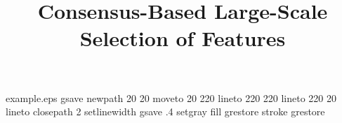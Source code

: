 %
%
%
%
%
\begin{filecontents*}{example.eps}
gsave
newpath
  20 20 moveto
  20 220 lineto
  220 220 lineto
  220 20 lineto
closepath
2 setlinewidth
gsave
  .4 setgray fill
grestore
stroke
grestore
\end{filecontents*}
%
\RequirePackage{fix-cm}
%
\documentclass[smallextended]{svjour3}       %
%
\smartqed  %
%
\usepackage{graphicx}
\usepackage{hyperref}
\usepackage{varioref}
\usepackage{url}
\usepackage{epsfig}
\usepackage{amsmath}
\usepackage{epsfig}
\usepackage{amssymb}
\usepackage{graphicx}
\usepackage{algorithm2e}
\usepackage{algorithmic}
\usepackage{subfigure}
%
%
%
%
%
\newcommand{\fix}{\marginpar{FIX}}
\newcommand{\new}{\marginpar{NEW}}
\newtheorem{defn}{Definition}
\newtheorem{thm}{Theorem}
\newenvironment{asm}{%
  \par\medskip\refstepcounter{asm}%
  \noindent\textbf{Assumption \theasm:}\quad}{\par\medskip}



\title{Consensus-Based Large-Scale Selection of Features%
}
\subtitle{}

